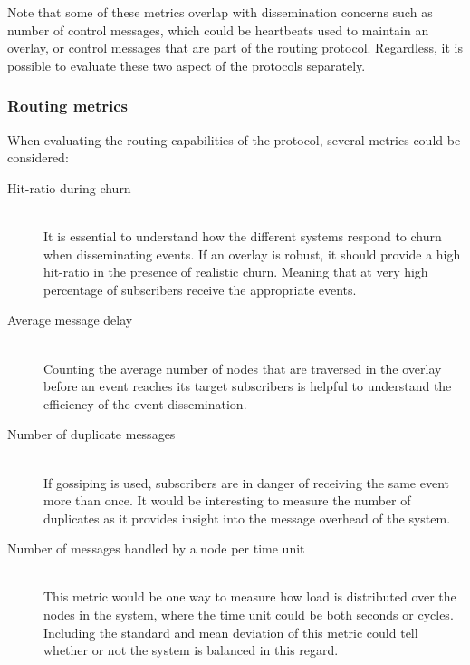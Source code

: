     Note that some of these metrics overlap with dissemination concerns
    such as number of control messages, which could be heartbeats
    used to maintain an overlay, or control messages that are part of
    the routing protocol. Regardless, it is possible to evaluate these
    two aspect of the protocols separately.

\subsubsection{Routing metrics}
    When evaluating the routing capabilities of the protocol, several
    metrics could be considered:

    \begin{description}
    \item[Hit-ratio during churn] \hfill\\
        It is essential to understand how the different systems respond to
        churn when disseminating events. If an overlay is robust, it should
        provide a high hit-ratio in the presence of realistic churn.
        Meaning that at very high percentage of subscribers receive the
        appropriate events.

    \item[Average message delay] \hfill\\
        Counting the average number of nodes that are traversed in the
        overlay before an event reaches its target subscribers is
        helpful to understand the efficiency of the event dissemination.

    \item[Number of duplicate messages] \hfill\\
        If gossiping is used, subscribers are in danger of receiving the
        same event more than once. It would be interesting to measure
        the number of duplicates as it provides insight into the message overhead of the
        system.

    \item[Number of messages handled by a node per time unit] \hfill\\
        This metric would be one way to measure how load is distributed
        over the nodes in the system, where the time unit could be both
        seconds or cycles. Including the standard and mean deviation of
        this metric could tell whether or not the system is balanced in
        this regard.

    \end{description}

